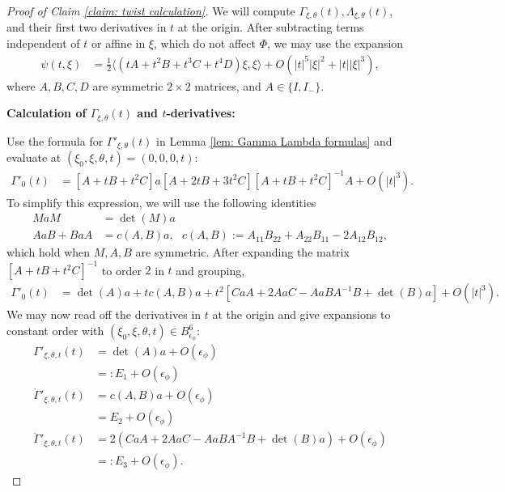 \documentclass[12pt]{amsart}
\numberwithin{equation}{section}
\newcommand{\1}{\mathbbm{1}}
\newcommand{\Bphi}{B_{\epsilon_\phi}}
\begin{document}
\begin{proof}[Proof of Claim \ref{claim: twist calculation}]
    We will compute $\Gamma_{\xi,\theta}(t), \Lambda_{\xi,\theta}(t)$, and their first two derivatives in $t$ at the origin. After subtracting terms independent of $t$ or affine in $\xi$, which do not affect $\Phi$, we may use the expansion
    \begin{align}
        \psi(t,\xi) &= \frac{1}{2} \langle (tA + t^2 B + t^3 C + t^4 D) \xi, \xi \rangle + O(|t|^5 |\xi|^2 + |t| |\xi|^3),
    \end{align}
    where $A,B,C,D$ are symmetric $2 \times 2$ matrices, and $A \in \{I, I_-\}$. 

    \medskip
    
    \noindent \textbf{Calculation of $\Gamma_{\xi,\theta}(t)$ and $t$-derivatives:}
    
    Use the formula for $\Gamma'_{\xi,\theta}(t)$ in Lemma \ref{lem: Gamma Lambda formulas} and evaluate at $(\xi_0,\xi,\theta,t) = (0,0,0,t)$:
    \begin{align}
        \Gamma'_0(t) &= [A  + tB + t^2 C]a[A + 2tB + 3t^2 C][A + tB + t^2C]^{-1} A + O(|t|^3). 
    \end{align}
    To simplify this expression, we will use the following identities
    \begin{align}
        M a M &= \det(M)a \\
        AaB + BaA &= c(A,B)a, \text{ $c(A,B) := A_{11}B_{22} + A_{22} B_{11} - 2A_{12} B_{12}$},
    \end{align}
    which hold when $M,A,B$ are symmetric. After expanding the matrix $[A+tB+t^2C]^{-1}$ to order $2$ in $t$ and grouping,
    \begin{align}
        \Gamma'_0(t) &= \det(A)a + tc(A,B)a + t^2[CaA + 2AaC - AaBA^{-1} B + \det(B)a] + O(|t|^3). 
    \end{align}
    We may now read off the derivatives in $t$ at the origin and give expansions to constant order with $(\xi_0,\xi,\theta,t) \in \Bphi^6$: 
    \begin{align}
        \Gamma'_{\xi,\theta,t}(t) &= \det(A) a + O(\epsilon_\phi) \\
        &=: E_1 + O(\epsilon_\phi) \\
        \dot \Gamma'_{\xi,\theta,t}(t) &= c(A,B) a + O(\epsilon_\phi)\\
        &= E_2 + O(\epsilon_\phi)\\
        \ddot \Gamma'_{\xi,\theta,t}(t) &= 2(CaA + 2AaC - AaBA^{-1}B + \det(B)a) + O(\epsilon_\phi) \\
        &=: E_3 + O(\epsilon_\phi). 
    \end{align}


\end{proof}
\end{document}
